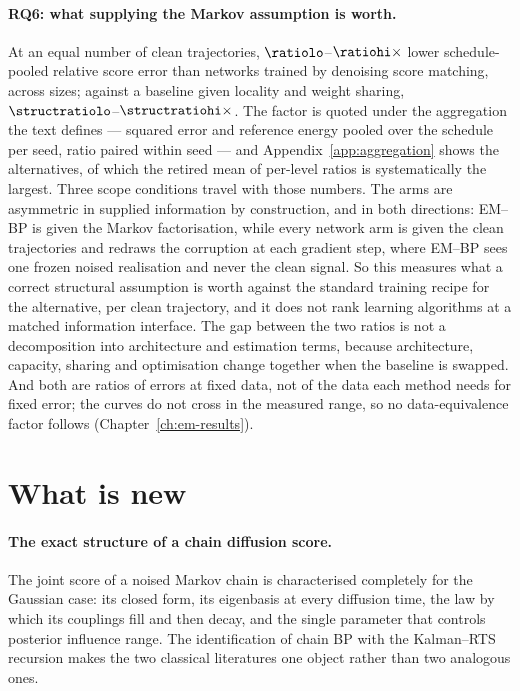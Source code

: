 \paragraph{RQ6: what supplying the Markov assumption is worth.} At an equal
number of clean trajectories, $\ratiolo$--$\ratiohi\times$ lower
schedule-pooled relative
score error than networks
trained by denoising score matching, across \nsizesused{} sizes; against a
baseline given locality and weight sharing, $\structratiolo$--$\structratiohi\times$.
The factor is quoted under the aggregation the text defines --- squared error
and reference energy pooled over the schedule per seed, ratio paired within
seed --- and Appendix~\ref{app:aggregation} shows the alternatives, of which
the retired mean of per-level ratios is systematically the largest.
Three scope conditions travel with those numbers. The arms are asymmetric in
supplied information by construction, and in both directions: EM--BP is given
the Markov factorisation, while every network arm is given the clean
trajectories and redraws the corruption at each gradient step, where EM--BP
sees one frozen noised realisation and never the clean signal. So this
measures what a correct structural assumption is worth against the standard
training recipe for the alternative, per clean trajectory, and it does not
rank learning algorithms at a matched information interface. The gap between the two ratios is not a decomposition into
architecture and estimation terms, because architecture, capacity, sharing and
optimisation change together when the baseline is swapped. And both are ratios
of errors at fixed data, not of the data each method needs for fixed error; the
curves do not cross in the measured range, so no data-equivalence factor follows
(Chapter~\ref{ch:em-results}).

\section{What is new}

\paragraph{The exact structure of a chain diffusion score.} The joint score of a
noised Markov chain is characterised completely for the Gaussian case: its
closed form, its eigenbasis at every diffusion time, the law by which its
couplings fill and then decay, and the single parameter that controls posterior
influence range. The identification of chain BP with the Kalman--RTS recursion
makes the two classical literatures one object rather than two analogous ones.

